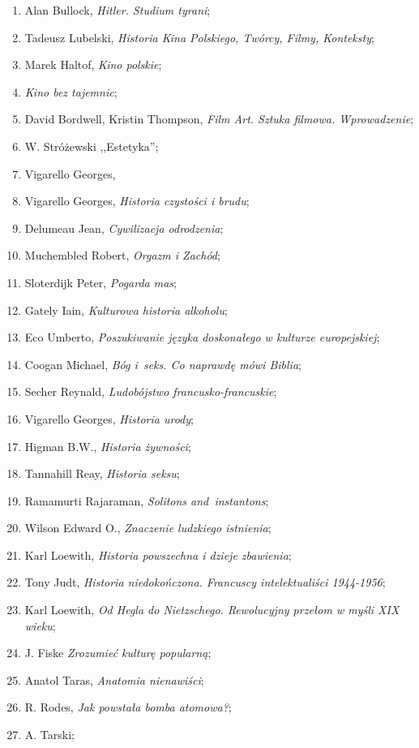 \documentclass[a4paper,11pt]{article}
\begin{document}
\begin{enumerate}
{    w~Żmiącej};
\item Alan Bullock, \emph{Hitler. Studium tyrani};
\item Tadeusz Lubelski, \emph{Historia Kina Polskiego, Twórcy, Filmy,
    Konteksty};
\item Marek Haltof, \emph{Kino polskie};
\item \emph{Kino bez tajemnic};
\item David Bordwell, Kristin Thompson, \emph{Film Art. Sztuka
    filmowa. Wprowadzenie};
\item W. Stróżewski ,,Estetyka'';
\item Vigarello Georges, \emph{}
\item Vigarello Georges, \emph{Historia czystości i brudu};
\item Delumeau Jean, \emph{Cywilizacja odrodzenia};
\item Muchembled Robert, \emph{Orgazm i Zachód};
\item Sloterdijk Peter, \emph{Pogarda mas};
\item Gately Iain, \emph{Kulturowa historia alkoholu};
\item Eco Umberto, \emph{Poszukiwanie języka doskonałego w kulturze
    europejskiej};
\item Coogan Michael, \emph{Bóg i~seks. Co naprawdę mówi Biblia};
\item Secher Reynald, \emph{Ludobójstwo francusko-francuskie};
\item Vigarello Georges, \emph{Historia urody};
\item Higman B.W., \emph{Historia żywności};
\item Tannahill Reay, \emph{Historia seksu};
\item Ramamurti Rajaraman, \emph{Solitons and~instantons};
\item Wilson Edward O., \emph{Znaczenie ludzkiego istnienia};
\item Karl Loewith, \emph{Historia powszechna i dzieje zbawienia};
\item Tony Judt, \emph{Historia niedokończona. Francuscy
    intelektualiści 1944-1956};
\item Karl Loewith, \emph{Od Hegla do Nietzschego. Rewolucyjny przełom
    w myśli XIX wieku};
\item J. Fiske \emph{Zrozumieć kulturę popularną};
\item Anatol Taras, \emph{Anatomia nienawiści};
\item R. Rodes, \emph{Jak powstała bomba atomowa?};
\item A. Tarski;

\end{enumerate}
\end{document}
